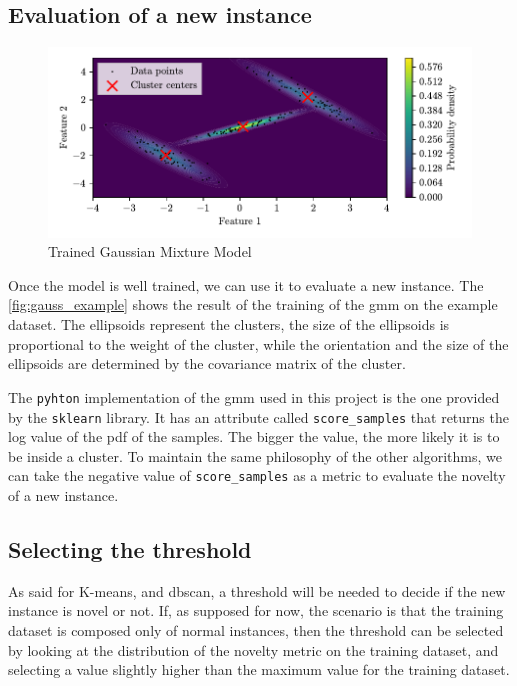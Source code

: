 \subsection{Evaluation of a new instance}
\label{sec:gauss_eval}
\begin{figure}
    \centering
    \includegraphics{images/Gaussian/Figure_2.pdf}
    \caption{Trained Gaussian Mixture Model}
    \label{fig:gauss_example}
\end{figure}
Once the model is well trained, we can use it to evaluate a new instance. The \autoref{fig:gauss_example} shows the result of the training of the \gls{gmm} on the example dataset. The ellipsoids represent the clusters, the size of the ellipsoids is proportional to the weight of the cluster, while the orientation and the size of the ellipsoids are determined by the covariance matrix of the cluster. 

The \texttt{pyhton} implementation of the \gls{gmm} used in this project is the one provided by the \texttt{sklearn} library. It has an attribute called \texttt{score\_samples} that returns the log value of the \gls{pdf} of the samples.
The bigger the value, the more likely it is to be inside a cluster. 
To maintain the same philosophy of the other algorithms, we can take the negative value of \texttt{score\_samples} as a metric to evaluate the novelty of a new instance. 

\subsection{Selecting the threshold}
As said for K-means, and \gls{dbscan}, a threshold will be needed to decide if the new instance is novel or not. If, as supposed for now, the scenario is that the training dataset is composed only of normal instances, then the threshold can be selected by looking at the distribution of the novelty metric on the training dataset, and selecting a value slightly higher than the maximum value for the training dataset.

